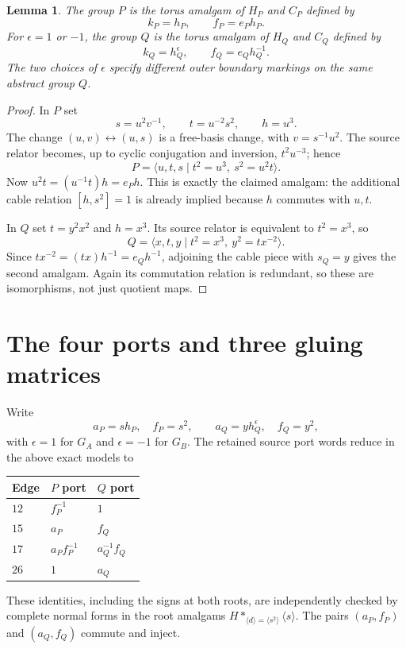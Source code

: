 \documentclass[11pt]{article}
\newtheorem{lemma}[theorem]{Lemma}
\begin{document}
\begin{lemma}\label{lem:models}
The group $P$ is the torus amalgam of $H_P$ and $C_P$ defined by
\[
 k_P=h_P,\qquad f_P=e_P h_P.
\]
For $\epsilon=1$ or $-1$, the group $Q$ is the torus amalgam of $H_Q$
and $C_Q$ defined by
\[
 k_Q=h_Q^\epsilon,\qquad f_Q=e_Qh_Q^{-1}.
\]
The two choices of $\epsilon$ specify different outer boundary markings
on the same abstract group $Q$.
\end{lemma}
\begin{proof}
In $P$ set
\[
 s=u^2v^{-1},\qquad t=u^{-2}s^2,\qquad h=u^3.
\]
The change $(u,v)\leftrightarrow(u,s)$ is a free-basis change, with
$v=s^{-1}u^2$. The source relator becomes, up to cyclic conjugation
and inversion, $t^2u^{-3}$; hence
\[
 P=\langle u,t,s\mid t^2=u^3,\ s^2=u^2t\rangle.
\]
Now $u^2t=(u^{-1}t)h=e_Ph$. This is exactly the claimed amalgam:
the additional cable relation $[h,s^2]=1$ is already implied because
$h$ commutes with $u,t$.

In $Q$ set $t=y^2x^2$ and $h=x^3$. Its source relator is equivalent
to $t^2=x^3$, so
\[
 Q=\langle x,t,y\mid t^2=x^3,\ y^2=tx^{-2}\rangle.
\]
Since $tx^{-2}=(tx)h^{-1}=e_Qh^{-1}$, adjoining the cable piece with
$s_Q=y$ gives the second amalgam. Again its commutation relation is
redundant, so these are isomorphisms, not just quotient maps.
\end{proof}

\section{The four ports and three gluing matrices}

Write
\[
 a_P=s h_P,\quad f_P=s^2,\qquad
 a_Q=y h_Q^\epsilon,\quad f_Q=y^2,
\]
with $\epsilon=1$ for $G_A$ and $\epsilon=-1$ for $G_B$.
The retained source port words reduce in the above exact models to
\begin{center}
\begin{tabular}{lll}
\toprule
Edge & $P$ port & $Q$ port\\
\midrule
$12$ & $f_P^{-1}$ & $1$\\
$15$ & $a_P$ & $f_Q$\\
$17$ & $a_P f_P^{-1}$ & $a_Q^{-1}f_Q$\\
$26$ & $1$ & $a_Q$\\
\bottomrule
\end{tabular}
\end{center}
These identities, including the signs at both roots, are independently
checked by complete normal forms in the root amalgams
$H*_{\langle d\rangle=\langle s^2\rangle}\langle s\rangle$.
The pairs $(a_P,f_P)$ and $(a_Q,f_Q)$ commute and inject.
\end{document}
